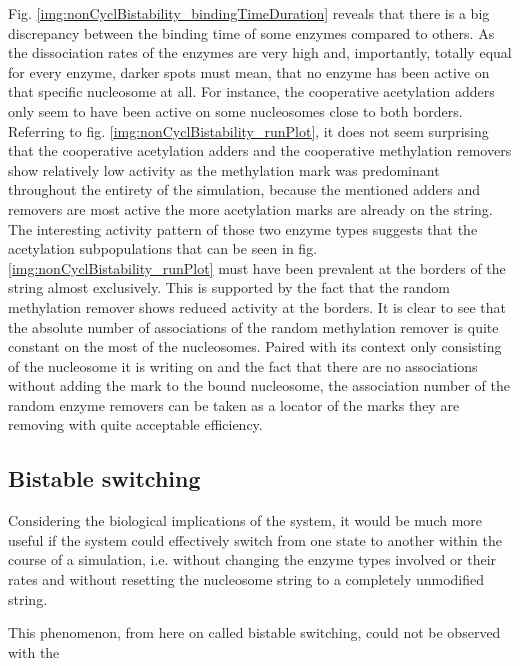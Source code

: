             Fig. \ref{img:nonCyclBistability_bindingTimeDuration} reveals that there is a big discrepancy between the binding time of some enzymes compared to others. As the dissociation rates of the enzymes are very high and, importantly, totally equal for every enzyme, darker spots must mean, that no enzyme has been active on that specific nucleosome at all. For instance, the cooperative acetylation adders only seem to have been active on some nucleosomes close to both borders. Referring to fig. \ref{img:nonCyclBistability_runPlot}, it does not seem surprising that the cooperative acetylation adders and the cooperative methylation removers show relatively low activity as the methylation mark was predominant throughout the entirety of the simulation, because the mentioned adders and removers are most active the more acetylation marks are already on the string. The interesting activity pattern of those two enzyme types suggests that the acetylation subpopulations that can be seen in fig. \ref{img:nonCyclBistability_runPlot} must have been prevalent at the borders of the string almost exclusively. This is supported by the fact that the random methylation remover shows reduced activity at the borders. It is clear to see that the absolute number of associations of the random methylation remover is quite constant on the most of the nucleosomes. Paired with its context only consisting of the nucleosome it is writing on and the fact that there are no associations without adding the mark to the bound nucleosome, the association number of the random enzyme removers can be taken as a locator of the marks they are removing with quite acceptable efficiency.


        \subsection{Bistable switching}
            Considering the biological implications of the system, it would be much more useful if the system could effectively switch from one state to another within the course of a simulation, i.e. without changing the enzyme types involved or their rates and without resetting the nucleosome string to a completely unmodified string.

            This phenomenon, from here on called bistable switching, could not be observed with the


